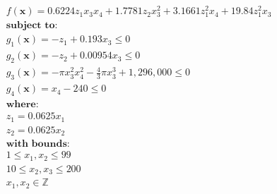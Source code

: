 \begin{equation*}
\begin{aligned}
& f(\bm{x}) = 0.6224z_1x_3x_4 + 1.7781z_2x_3^2 + 3.1661z_1^2x_4 + 19.84z_1^2x_3 \\[0.5em]
& \textbf{subject to:}\\
& g_1(\bm{x}) = -z_1 + 0.193x_3 \leq 0 \\
& g_2(\bm{x}) = -z_2 + 0.00954x_3 \leq 0 \\
& g_3(\bm{x}) = -\pi x_3^2x_4^2 - \frac{4}{3} \pi x_3^3 + 1,296,000 \leq 0 \\
& g_4(\bm{x}) = x_4 - 240  \leq 0 \\[0.5em]
& \textbf{where:} \\
& z_1 = 0.0625x_1 \\
& z_2 = 0.0625x_2 \\[0.5em]
& \textbf{with bounds:} \\
& 1 \leq x_1, x_2 \leq 99 \\
& 10 \leq x_2, x_3 \leq 200 \\
& x_1, x_2 \in \mathbb{Z}
\end{aligned}
\end{equation*}